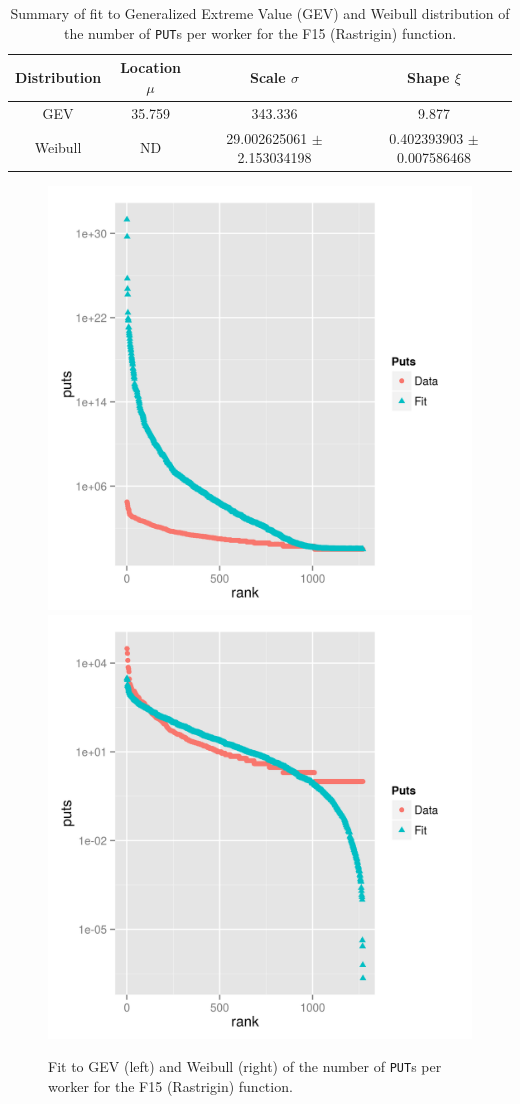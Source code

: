 \documentclass[journal,onecolumn]{IEEEtran}
\begin{document}
%
\begin{table}
\caption{Summary of fit to Generalized Extreme Value (GEV) and Weibull distribution of
  the number of {\tt PUT}s per worker for the F15 (Rastrigin) function. \label{tab:puts:ww:f15}}
\begin{center}
\begin{tabular}{cccc}
\hline
Distribution & Location $\mu$ & Scale $\sigma$ & Shape $\xi$ \\
\hline
GEV & 35.759  &  343.336   & 9.877 \\
Weibull & ND & 29.002625061 $\pm$ 2.153034198  & 0.402393903 $\pm$ 0.007586468 \\
\hline
\end{tabular}
\end{center}
\end{table}
%
\begin{figure}[!htb]
\centering
\includegraphics[width=0.49\linewidth]{gev-fit-ww-rastrigin-workers.png}
\includegraphics[width=0.49\linewidth]{weibull-fit-ww-rastrigin-workers.png}
\caption{Fit to GEV (left) and Weibull (right) of the number of {\tt PUT}s per worker for the F15 (Rastrigin) function.} 
\label{fig:fit:rastrigin}
\end{figure}
%
\end{document}
